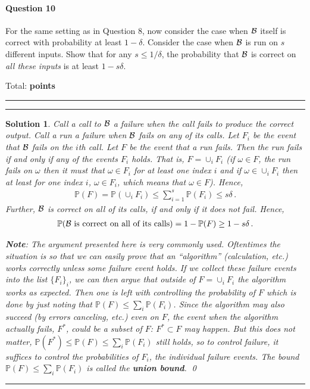 \documentclass{article}
\DeclareMathOperator*{\1}{\mathbbm{1}}
\newcommand{\Prob}[1]{\mathbb{P}( #1 )}
\newcounter{DocPoints} %
\newcounter{QuestionPoints} %
\newcommand{\tpoints}[1]{        %
	\ifthenelse{\isempty{#1}}%
	{%
	}%
	{%
		\addtocounter{DocPoints}{#1}
		\addtocounter{QuestionPoints}{#1}
	}													 %
	\par\mbox{}\par\noindent\hfill {Total: \bf \arabic{QuestionPoints}\xspace points}\par\mbox{}\par\hrule\hrule
	\setcounter{QuestionPoints}{0}
}
\newtheorem*{solution*}{Solution}
\begin{document}
\paragraph{Question 10}
For the same setting as in Question 8, now consider the case when $\mathcal{B}$ itself is correct with probability at least $1-\delta$.
Consider the case when $\mathcal{B}$ is run on $s$ different inputs.
Show that 
for any $s\le 1/\delta$,
the probability that $\mathcal{B}$ is correct on \emph{all these inputs} is at least $1-s\delta$.
\tpoints{5}

\begin{solution*}
Call a call to $\mathcal{B}$ a failure when the call fails to produce the correct output.
Call a run a failure when $\mathcal{B}$ fails on any of its calls.
Let $F_i$ be the event that $\mathcal{B}$ fails on the $i$th call. Let $F$ be the event that a run fails.
Then the run fails if and only if any of the events $F_i$ holds.
That is, $F = \cup_i F_i$ (if $\omega\in F$, the run fails on $\omega$ then it must that $\omega \in F_i$ for at least one index $i$ and if $\omega\in \cup_i F_i$ then at least for one index $i$, $\omega\in F_i$, which means that $\omega\in F$).
Hence,
\begin{align*}
\Prob{F} = \Prob{\cup_i F_i} \le \sum_{i=1}^s \Prob{F_i} \le s \delta\,.
\end{align*}
Further, $\mathcal{B}$ is correct on all of its calls, if and only if it does not fail. Hence,
\begin{align*}
\Prob{ \cB \text{ is correct on all of its calls}} = 1- \Prob{F}\ge 1-s\delta\,.
\end{align*}

\noindent \textbf{Note}: The argument presented here is very commonly used.
Oftentimes the situation is so that we can easily prove that an ``algorithm'' (calculation, etc.) works correctly unless \emph{some} failure event holds. If we collect these failure events into the list $\{F_i\}_i$, we can then argue that outside of $F = \cup_i F_i$ the algorithm works as expected. Then one is left with controlling the probability of  $F$ which is done by just noting that $\Prob{F}\le \sum_i \Prob{F_i}$. Since the algorithm may also succeed (by errors canceling, etc.) even on $F$, the event when the algorithm actually fails, $F^*$, could be a subset of $F$: $F^* \subset F$ may happen.
But this does not matter, $\Prob{F^*} \le \Prob{F} \le \sum_i \Prob{F_i}$ still holds, so to control failure, it suffices to control the probabilities of $F_i$, the individual failure events.
The bound $\Prob{F} \le \sum_i \Prob{F_i}$ is called the \textbf{union bound}.
\qed\par\bigskip\par\hrule
\end{solution*}
\end{document}
